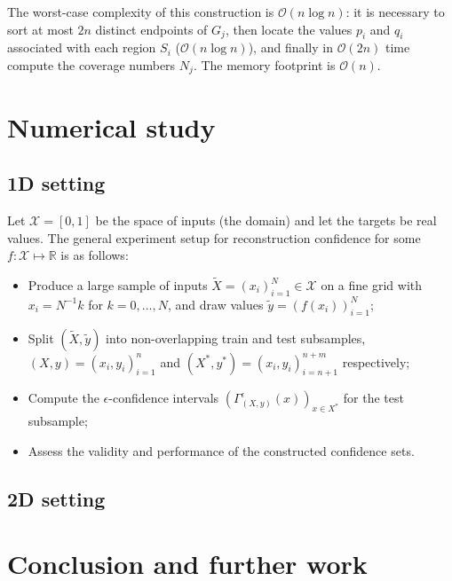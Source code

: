 \documentclass[a4paper]{article}
\newcommand{\Xcal}{\mathcal{X}}
\newcommand{\Real}{\mathbb{R}}
\begin{document}
The worst-case complexity of this construction is $\mathcal{O}(n \log n)$: it is
necessary to sort at most $2n$ distinct endpoints of $G_j$, then locate the values
$p_i$ and $q_i$ associated with each region $S_i$ ($\mathcal{O}(n\log n)$), and
finally in $\mathcal{O}(2n)$ time compute the coverage numbers $N_j$. The memory
footprint is $\mathcal{O}(n)$.



\section{Numerical study} %
\label{sec:numerical_study}



\subsection{1D setting} %
\label{sub:1d_setting}

Let $\Xcal =[0,1]$ be the space of inputs (the domain) and let the targets be real
values. The general experiment setup for reconstruction confidence for some
$f:\Xcal\mapsto\Real$ is as follows:
\begin{itemize}
    \item Produce a large sample of inputs $\tilde{X} = (x_i)_{i=1}^N\in \Xcal$
    on a fine grid with $x_i = N^{-1} k$ for $k=0, \ldots, N$, and draw values
    $\tilde{y}=(f(x_i))_{i=1}^N$;
    \item Split $(\tilde{X}, \tilde{y})$ into non-overlapping train and test subsamples,
    $(X, y) = (x_i, y_i)_{i=1}^n$ and $(X^*, y^*) = (x_i, y_i)_{i=n+1}^{n+m}$ respectively;
    \item Compute the $\epsilon$-confidence intervals $(\Gamma^\epsilon_{(X, y)}(x))_{x\in X^*}$
    for the test subsample;
    \item Assess the validity and performance of the constructed confidence sets.
\end{itemize}


\subsection{2D setting} %
\label{sub:2d_setting}



\section{Conclusion and further work} %
\label{sec:conclusion_and_further_work}

\end{document}
